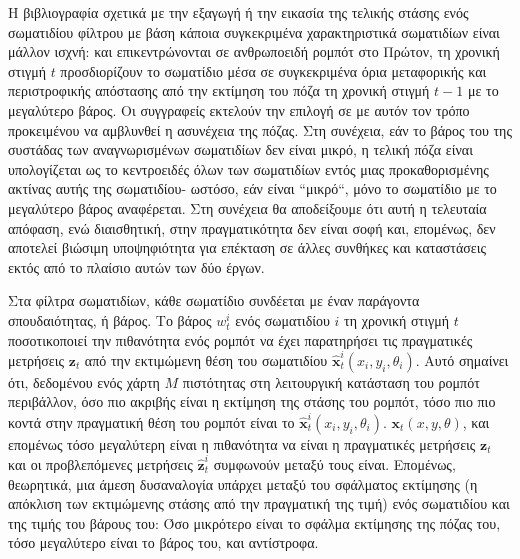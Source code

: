 Η βιβλιογραφία σχετικά με την εξαγωγή ή την εικασία της τελικής στάσης ενός σωματιδίου
φίλτρου με βάση κάποια συγκεκριμένα χαρακτηριστικά σωματιδίων είναι μάλλον ισχνή:
\cite{selection_1} και \cite{selection_2} επικεντρώνονται σε ανθρωποειδή ρομπότ στο
Πρώτον, τη χρονική στιγμή $t$ προσδιορίζουν το σωματίδιο μέσα σε
συγκεκριμένα όρια μεταφορικής και περιστροφικής απόστασης από την εκτίμηση του
πόζα τη χρονική στιγμή $t-1$ με το μεγαλύτερο βάρος. Οι συγγραφείς εκτελούν την επιλογή σε
με αυτόν τον τρόπο προκειμένου να αμβλυνθεί η ασυνέχεια της πόζας. Στη συνέχεια, εάν το βάρος του
της συστάδας των αναγνωρισμένων σωματιδίων δεν είναι μικρό, η τελική πόζα είναι
υπολογίζεται ως το κεντροειδές όλων των σωματιδίων εντός μιας προκαθορισμένης ακτίνας αυτής της
σωματιδίου- ωστόσο, εάν είναι ``μικρό``, μόνο το σωματίδιο με το μεγαλύτερο βάρος
αναφέρεται. Στη συνέχεια θα αποδείξουμε ότι αυτή η τελευταία απόφαση, ενώ
διαισθητική, στην πραγματικότητα δεν είναι σοφή και, επομένως, δεν αποτελεί βιώσιμη υποψηφιότητα για
επέκταση σε άλλες συνθήκες και καταστάσεις εκτός από το πλαίσιο αυτών των
δύο έργων.


Στα φίλτρα σωματιδίων, κάθε σωματίδιο συνδέεται με έναν παράγοντα σπουδαιότητας,
ή βάρος. Το βάρος $w_t^i$ ενός σωματιδίου $i$ τη χρονική στιγμή $t$ ποσοτικοποιεί
την πιθανότητα ενός ρομπότ να έχει παρατηρήσει τις πραγματικές μετρήσεις $\bm{z}_t$
από την εκτιμώμενη θέση του σωματιδίου $\hat{\bm{x}}_t^i(x_i, y_i, \theta_i)$.
Αυτό σημαίνει ότι, δεδομένου ενός χάρτη $M$ πιστότητας στη λειτουργική κατάσταση του ρομπότ
περιβάλλον, όσο πιο ακριβής είναι η εκτίμηση της στάσης του ρομπότ, τόσο πιο
πιο κοντά στην πραγματική θέση του ρομπότ είναι το $\hat{\bm{x}}_t^i(x_i, y_i, \theta_i)$.
$\bm{x}_t(x,y,\theta)$, και επομένως τόσο μεγαλύτερη είναι η πιθανότητα να είναι η
πραγματικές μετρήσεις $\bm{z}_t$ και οι προβλεπόμενες μετρήσεις
$\hat{\bm{z}}_t^i$ συμφωνούν μεταξύ τους είναι. Επομένως, θεωρητικά, μια άμεση
δυσαναλογία υπάρχει μεταξύ του σφάλματος εκτίμησης (η απόκλιση των
εκτιμώμενης στάσης από την πραγματική της τιμή) ενός σωματιδίου και της τιμής του βάρους του:
Όσο μικρότερο είναι το σφάλμα εκτίμησης της πόζας του, τόσο μεγαλύτερο είναι το βάρος του, και αντίστροφα.

